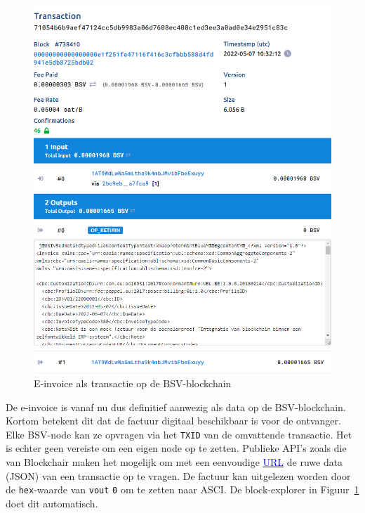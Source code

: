 \begin{figure}[H]
	\centering
	\includegraphics[width=\linewidth]{img/proof-of-concept/factuur-transactie-2.png}
	\caption{\label{fig:factuur-transactie}E-invoice als transactie op de BSV-blockchain}
\end{figure}

De e-invoice is vanaf nu dus definitief aanwezig als data op de BSV-blockchain. Kortom betekent dit dat de factuur digitaal beschikbaar is voor de ontvanger. Elke BSV-node kan ze opvragen via het \verb*|TXID| van de omvattende transactie. Het is echter geen vereiste om een eigen node op te zetten. Publieke API's zoals die van Blockchair maken het mogelijk om met een eenvoudige \href{https://api.blockchair.com/bitcoin-sv/raw/transaction/031fcc00b88fcc2252107be98c085eea528c470df9d910387947f60adae80287}{\textcolor{blue}{URL}} de ruwe data (JSON) van een transactie op te vragen. De factuur kan uitgelezen worden door de \verb*|hex|-waarde van \verb*|vout| \verb*|0| om te zetten naar ASCI. De block-explorer in Figuur~\ref{fig:factuur-transactie} doet dit automatisch.



